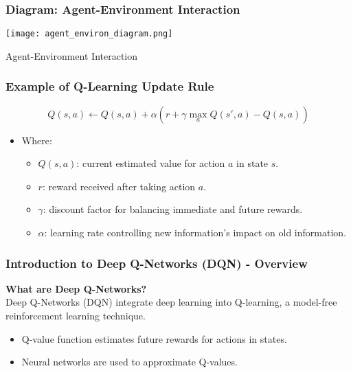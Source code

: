 \documentclass[aspectratio=169]{beamer}
\begin{document}
\begin{frame}[fragile]
    \frametitle{Diagram: Agent-Environment Interaction}
    \begin{center}
        \texttt{[image: agent\_environ\_diagram.png]}
        \caption{Agent-Environment Interaction}
    \end{center}
\end{frame}

\begin{frame}[fragile]
    \frametitle{Example of Q-Learning Update Rule}
    \begin{equation}
        Q(s, a) \leftarrow Q(s, a) + \alpha \left( r + \gamma \max_a Q(s', a) - Q(s, a) \right)
    \end{equation}
    \begin{itemize}
        \item Where:
            \begin{itemize}
                \item \(Q(s, a)\): current estimated value for action \(a\) in state \(s\).
                \item \(r\): reward received after taking action \(a\).
                \item \(\gamma\): discount factor for balancing immediate and future rewards.
                \item \(\alpha\): learning rate controlling new information's impact on old information.
            \end{itemize}
    \end{itemize}
\end{frame}

\begin{frame}[fragile]
    \frametitle{Introduction to Deep Q-Networks (DQN) - Overview}
    \textbf{What are Deep Q-Networks?} \\[8pt]
    Deep Q-Networks (DQN) integrate deep learning into Q-learning, a model-free reinforcement learning technique.
    \begin{itemize}
        \item Q-value function estimates future rewards for actions in states.
        \item Neural networks are used to approximate Q-values.
    \end{itemize}
\end{frame}
\end{document}
